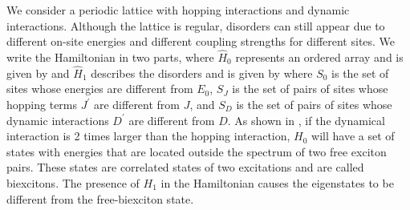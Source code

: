 We consider a periodic lattice with hopping interactions and dynamic interactions. Although 
the lattice is regular, disorders can still appear due to different on-site energies and different coupling strengths for 
different sites. 
We write the Hamiltonian in two parts, 
where $\hat{H}_0$ represents an ordered array and is given by
and $\hat{H}_1$ describes the disorders and is given by
where $S_0$ is the set of sites whose energies are different from $E_0$, $S_J$ is the set of pairs of sites whose 
hopping terms 
$J^{\prime}$ are different from $J$, and $S_D$ is the set of pairs of sites whose dynamic interactions 
$D^{\prime}$ are different from $D$. 
As shown in , if the dynamical interaction is 2 times larger than the hopping interaction,  $H_0$
will have a set of states with energies that are located outside the spectrum of two free exciton pairs. These states
are correlated  states of two excitations and are called biexcitons. The presence of $H_1$ in the Hamiltonian causes 
the eigenstates to be different from the free-biexciton state.

